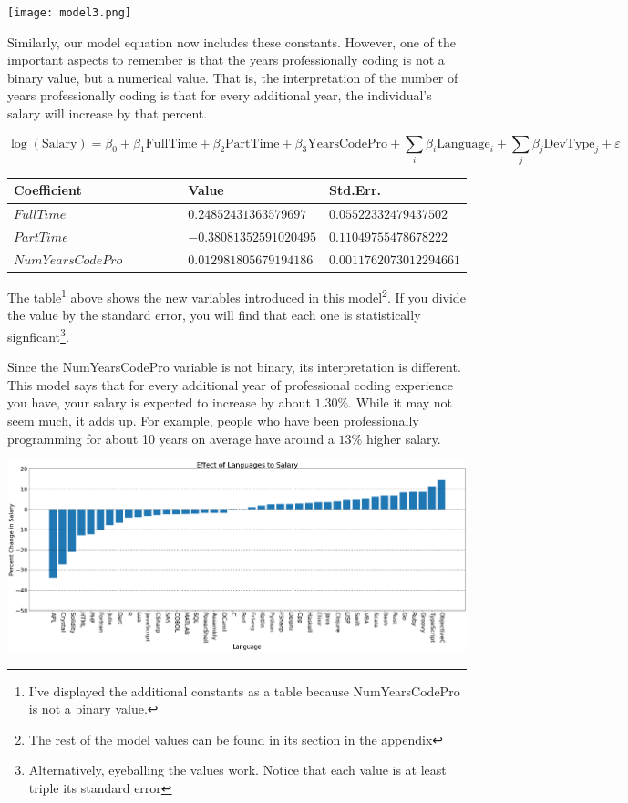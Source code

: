 \documentclass{report}
\begin{document}
\texttt{[image: model3.png]}

Similarly, our model equation now includes these constants. However, one of the important aspects to remember is that the years professionally coding is not a binary value, but a numerical value. That is, the interpretation of the number of years professionally coding is that for every additional year, the individual's salary will increase by that percent.

$$\log({\text{Salary}}) = \beta_0 + \beta_1 \text{FullTime} + \beta_2 \text{PartTime} + \beta_3 \text{YearsCodePro} + \sum_i{\beta_i \text{Language}_i} + \sum_j{\beta_j \text{DevType}_j} + \varepsilon$$

\begin{longtable}{|R{0.4\linewidth}|R{0.3\linewidth}|R{0.3\linewidth}|}
  \hline
  \textbf{Coefficient} & \textbf{Value} & \textbf{Std.Err.} \\
  \hline
  $FullTime$ & $0.24852431363579697$ & $0.05522332479437502$\\
  \hline
  $PartTime$ & $-0.38081352591020495$ & $0.11049755478678222$\\
  \hline
  $NumYearsCodePro$ & $0.012981805679194186$ & $0.0011762073012294661$ \\
  \hline
\end{longtable}

The table\footnote{I've displayed the additional constants as a table because NumYearsCodePro is not a binary value.} above shows the new variables introduced in this model\footnote{The rest of the model values can be found in its \hyperref[data:model3]{section in the appendix}}. If you divide the value by the standard error, you will find that each one is statistically signficant\footnote{Alternatively, eyeballing the values work. Notice that each value is at least triple its standard error}.

Since the NumYearsCodePro variable is not binary, its interpretation is different. This model says that for every additional year of professional coding experience you have, your salary is expected to increase by about $1.30\%$. While it may not seem much, it adds up. For example, people who have been professionally programming for about 10 years on average have around a $13\%$ higher salary.

\vspace{0.5in}

\includegraphics[width=0.9\linewidth]{model3coefficientlanguages.png}
\end{document}
